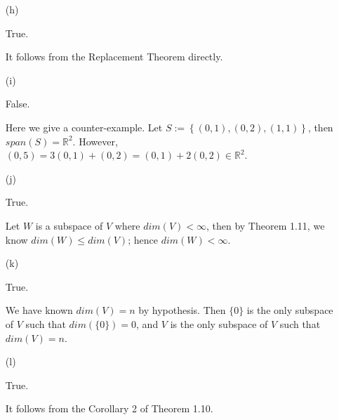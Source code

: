 \begin{Exercise}
\begin{enumerate}[(a)]
\item[(h)]
\begin{answer}
True.
\end{answer}
\begin{solution}
It follows from the Replacement Theorem directly.
\end{solution}

\item[(i)]
\begin{answer}
False.
\end{answer}
\begin{solution}
Here we give a counter-example. Let $S := \left\{(0,1),(0,2),(1,1)\right\}$, then $span(S) = \mathbb{R}^2$. However, $(0,5) = 3(0,1)+(0,2) = (0,1)+2(0,2)\in\mathbb{R}^2$.
\end{solution}

\item[(j)]
\begin{answer}
True.
\end{answer}
\begin{solution}
Let $W$ is a subspace of $V$ where $dim(V) < \infty$, then by Theorem 1.11, we know $dim(W)\leq dim(V)$; hence $dim(W) < \infty$.
\end{solution}

\item[(k)]
\begin{answer}
True.
\end{answer}
\begin{solution}
We have known $dim(V) = n$ by hypothesis. Then $\{0\}$ is the only subspace of $V$ such that $dim(\{0\}) = 0$, and $V$ is the only subspace of $V$ such that $dim(V) = n$.
\end{solution}

\item[(l)]
\begin{answer}
True.
\end{answer}
\begin{solution}
It follows from the Corollary 2 of Theorem 1.10.
\end{solution}

\end{enumerate}
\end{Exercise}